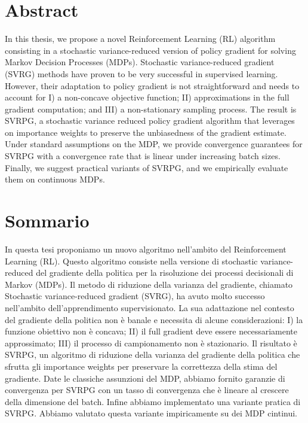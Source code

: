 
\begingroup
\let\clearpage\relax
\let\cleardoublepage\relax
\let\cleardoublepage\relax

\chapter*{Abstract}
In this thesis, we propose a novel Reinforcement Learning (\acs{RL}) algorithm consisting in a stochastic variance-reduced version of policy gradient for solving Markov Decision Processes (\acs{MDP}s).\newline
Stochastic variance-reduced gradient (\acs{SVRG}) methods have proven to be very successful in supervised learning. However, their adaptation to policy gradient is not straightforward and needs to account for I) a non-concave objective function; II) approximations in the full gradient computation; and III) a non-stationary sampling process. The result is \acs{SVRPG}, a stochastic variance reduced policy gradient algorithm that leverages on importance weights to preserve the unbiasedness of the gradient estimate. Under standard assumptions on the \acs{MDP}, we provide convergence guarantees for \acs{SVRPG} with a convergence rate that is linear under increasing batch sizes. Finally, we suggest practical variants of \acs{SVRPG}, and we empirically evaluate them on continuous \acs{MDP}s.

\vfill
\newpage
{}
\chapter*{Sommario}
In questa tesi proponiamo un nuovo algoritmo nell'ambito del Reinforcement Learning (\acs{RL}). Questo algoritmo consiste  nella versione di stochastic variance-reduced del gradiente della politica per la risoluzione dei processi decisionali di Markov (\acs{MDP}s).\newline
Il metodo di riduzione della varianza del gradiente, chiamato Stochastic variance-reduced gradient (\acs{SVRG}), ha avuto molto successo nell'ambito dell'apprendimento supervisionato. La sua adattazione nel contesto del gradiente della politica non è banale e necessita di alcune considerazioni: I) la funzione obiettivo non è concava; II) il full gradient deve essere necessariamente approssimato;  III) il processo di campionamento non è stazionario. Il risultato è \acs{SVRPG}, un algoritmo di riduzione della varianza del gradiente della politica che sfrutta gli importance weights per preservare la correttezza della stima del gradiente. Date le classiche assunzioni del \acs{MDP}, abbiamo fornito garanzie di convergenza per \acs{SVRPG} con un tasso di convergenza che è lineare al crescere della dimensione del batch. Infine abbiamo implementato una variante pratica di \acs{SVRPG}. Abbiamo valutato questa variante impiricamente  su dei \acs{MDP} cintinui.

\endgroup